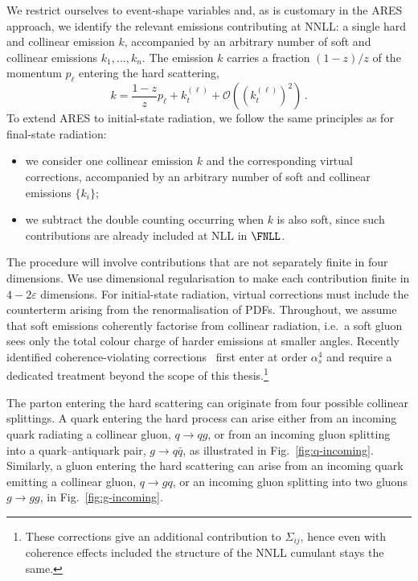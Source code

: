 We restrict ourselves to event-shape variables and, as is customary in
the \textsc{ARES} approach, we identify the relevant emissions contributing 
at NNLL: a single hard and collinear emission $k$, accompanied by an arbitrary number of soft and collinear emissions $k_1,\dots,k_n$. 
The emission $k$ carries a fraction $(1-z)/z$ of the momentum $p_\ell$ entering the hard scattering, 
\begin{equation}
  \label{eq:k||l}
  k = \frac{1-z}{z} p_\ell + k_t^{(\ell)}+ \mathcal{O}\left(\left(k_t^{(\ell)}\right)^2\right)\,.
\end{equation}
To extend \textsc{ARES} to initial-state radiation, we follow the 
same principles as for final-state radiation: 
\begin{itemize}
\item we consider one collinear emission $k$ and the corresponding virtual
  corrections, accompanied by an arbitrary
  number of soft and collinear emissions $\{k_i\}$;
\item we subtract the double counting occurring when $k$ is also soft,
since such contributions are already included at NLL in $\FNLL$.
\end{itemize}
The procedure will involve contributions that are not separately
finite in four dimensions. We use dimensional regularisation to make
each contribution finite in $4-2\varepsilon$ dimensions. For initial-state radiation, virtual corrections must include the
counterterm arising from the renormalisation of PDFs. Throughout, we assume that soft emissions coherently factorise 
from collinear radiation, i.e.\ a soft gluon sees only the total 
colour charge of harder emissions at smaller angles. 
Recently identified
coherence-violating corrections~\cite{Banfi:2025mra,Becher:2026kbr}
first enter at order $\alpha_s^4$ and require a dedicated treatment
beyond the scope of this thesis.\footnote{These corrections give an additional
contribution to $\Sigma_{ij}$, hence even with coherence effects included the structure of the NNLL cumulant stays the same.}

The parton entering the hard scattering can originate from four
possible collinear splittings. A quark entering the hard process can
arise either from an incoming quark radiating a collinear gluon,
$q\to qg$, or from an incoming gluon splitting into a
quark--antiquark pair, $g\to q\bar q$, as illustrated in
Fig.~\ref{fig:q-incoming}. Similarly, a gluon entering the hard
scattering can arise from an incoming quark emitting a
collinear gluon, $q\to gq$, or an incoming gluon splitting into two
gluons $g\to gg$, in Fig.~\ref{fig:g-incoming}.

